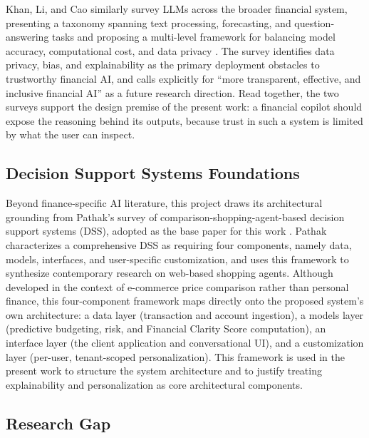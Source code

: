 \documentclass[conference]{IEEEtran}
\begin{document}
Khan, Li, and Cao similarly survey LLMs across the broader financial system, presenting a taxonomy spanning text processing, forecasting, and question-answering tasks and proposing a multi-level framework for balancing model accuracy, computational cost, and data privacy \cite{khan2025bridging}. The survey identifies data privacy, bias, and explainability as the primary deployment obstacles to trustworthy financial AI, and calls explicitly for ``more transparent, effective, and inclusive financial AI'' as a future research direction. Read together, the two surveys support the design premise of the present work: a financial copilot should expose the reasoning behind its outputs, because trust in such a system is limited by what the user can inspect.

\subsection{Decision Support Systems Foundations}

Beyond finance-specific AI literature, this project draws its architectural grounding from Pathak's survey of comparison-shopping-agent-based decision support systems (DSS), adopted as the base paper for this work \cite{pathak2010survey}. Pathak characterizes a comprehensive DSS as requiring four components, namely data, models, interfaces, and user-specific customization, and uses this framework to synthesize contemporary research on web-based shopping agents. Although developed in the context of e-commerce price comparison rather than personal finance, this four-component framework maps directly onto the proposed system's own architecture: a data layer (transaction and account ingestion), a models layer (predictive budgeting, risk, and Financial Clarity Score computation), an interface layer (the client application and conversational UI), and a customization layer (per-user, tenant-scoped personalization). This framework is used in the present work to structure the system architecture and to justify treating explainability and personalization as core architectural components.

\subsection{Research Gap}
\end{document}
